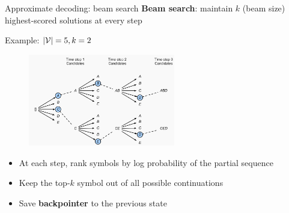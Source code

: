 \documentclass[usenames,dvipsnames,notes,11pt,aspectratio=169,hyperref={colorlinks=true, linkcolor=blue}]{beamer}
\newcommand{\pdfnote}[1]{}
\begin{document}
\begin{frame}
    {Approximate decoding: beam search}
    \textbf{Beam search}: maintain $k$ (beam size) highest-scored  solutions at every step 
    
    Example: $|\mathcal{V}|=5, k=2$
    \vspace{-1em}
    \begin{figure}
        \includegraphics[height=4cm]{figures/beam-search}
    \end{figure}
    \vspace{-1em}
    \pdfnote{
        At each step, we want to find the partial sequence with the highest score.
        At the end, we would have the highest scoring complete sequence.
        But isn't this more expensive?
        We need to use DP here by reusing previous result.
        By chain rule, at each step, we can reuse previous compute.
        But still, this isn't saving us much compute, because we are still enumerating the score of all sequences.
        The main trick in beam search is to reduce the search space at each step to a constant number, i.e. the beam size.
        Basically, we only save the top-k partial sequences at each step.
    }

    \begin{itemize}
        \item At each step, rank symbols by log probability of the partial sequence
        \item Keep the top-$k$ symbol out of all possible continuations
        \item Save \textbf{backpointer} to the previous state
    \end{itemize}
\end{frame}
\end{document}
